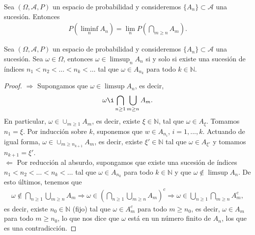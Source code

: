 \begin{teo}
    Sea $(\Omega,\mathcal{A},P)$ un espacio de probabilidad y consideremos $\{A_n\} \subset \mathcal{A}$ una sucesión. Entonces
    \begin{align*}
        P\left( \liminf_n A_n \right) = \lim_n P\left( \bigcap_{m \ge n} A_m \right).
    \end{align*}
\end{teo}

\begin{teo}
    Sea $(\Omega,\mathcal{A},P)$ un espacio de probabilidad y consideremos $\{A_n\} \subset \mathcal{A}$ una sucesión. Sea $\omega \in \Omega$, entonces $\omega \in \limsup_n A_n$ si y solo si existe una sucesión de índices $n_1 < n_2 < \ldots < n_k < \ldots $ tal que $\omega \in A_{n_k}$ para todo $k \in \mathbb{N}$.
\end{teo}

\begin{proof}
    $\boxed{\Longrightarrow}$ Supongamos que $\omega \in \limsup A_n$, es decir,
    \begin{align*}
        \omega \i \bigcap_{n \ge 1} \bigcup_{m \ge n} A_m.
    \end{align*}
    En particular, $\omega \in \cup_{m \ge 1} A_m$, es decir, existe $\xi \in \mathbb{N}$, tal que $\omega \in A_{\xi}$. Tomamos $n_1 = \xi$. Por inducción sobre $k$, suponemos que $w \in A_{n_i}$, $i=1,...,k$. Actuando de igual forma, $\omega \in \cup_{m \ge n_{k+1}} A_m$, es decir, existe $\xi' \in \mathbb{N}$ tal que $\omega \in A_{\xi'}$ y tomamos $n_{k+1} = \xi'$.
    \\
    \newline
    $\boxed{\Longleftarrow}$ Por reducción al absurdo, supongamos que existe una sucesión de índices $n_1 < n_2 < \ldots < n_k < \ldots $ tal que $\omega \in A_{n_k}$ para todo $k \in \mathbb{N}$ y que $\omega \not \in \limsup A_n$. De esto últimos, tenemos que
    \begin{align*}
        \omega \not \in \bigcap_{n \ge 1} \bigcup_{m \ge n} A_m \Longrightarrow \omega \in \left( \bigcap_{n \ge 1} \bigcup_{m \ge n} A_m \right)^c \Longrightarrow \omega \in \bigcup_{n \ge 1} \bigcap_{m \ge n} A_m^c,
    \end{align*}
    es decir, existe $n_0 \in \mathbb{N}$ (fijo) tal que $\omega \in A_m^c$ para todo $m \ge n_0$, es decir, $\omega \in A_m$ para todo $m \ge n_0$, lo que nos dice que $\omega$ está en un número finito de $A_n$, los que es una contradicción.
\end{proof}

